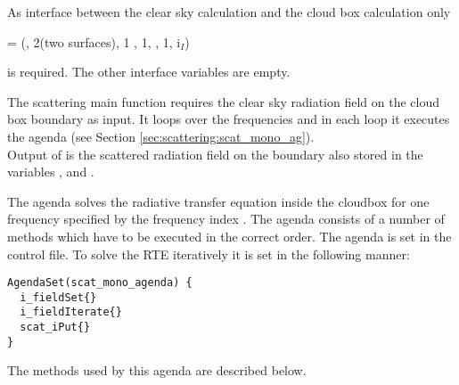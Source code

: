 As interface between the clear sky calculation and the cloud box calculation only 
  \begin{center}
   =  (\Frq, 2(two surfaces), 1 , 1, \ScaZa,
1, i$_I$)
\end{center}
is required. The other interface variables are empty. 

\label{sec:scattering:main_function}

The scattering main function  requires the clear sky radiation 
field on the cloud box boundary as input.
It loops over the frequencies and in each loop it executes the agenda 
(see Section \ref{sec:scattering:scat_mono_ag}).\\
Output of  is the scattered radiation field on the
boundary also stored in the variables ,
and .


\label{sec:scattering:scat_mono_ag}

The agenda  solves the radiative transfer
equation inside the cloudbox for one frequency specified
by the frequency index . 
The agenda consists of a number of methods which have to be executed in
the correct order.
The agenda is set in the control file. To solve the RTE iteratively it
is set in the following manner:

\begin{verbatim}
AgendaSet(scat_mono_agenda) {
  i_fieldSet{}
  i_fieldIterate{}
  scat_iPut{}
}
\end{verbatim}

\noindent
The methods used by this agenda are described below.

